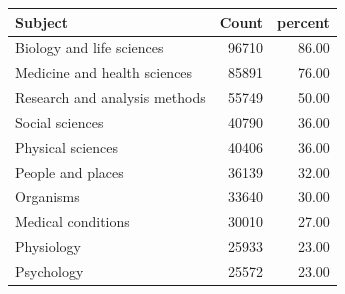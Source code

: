 \begin{table}[ht]
\centering
\begin{tabular}{lrr}
 Subject & Count & percent \\ 
  \hline
Biology and life sciences & 96710 & 86.00 \\ 
  Medicine and health sciences & 85891 & 76.00 \\ 
  Research and analysis methods & 55749 & 50.00 \\ 
  Social sciences & 40790 & 36.00 \\ 
  Physical sciences & 40406 & 36.00 \\ 
  People and places & 36139 & 32.00 \\ 
  Organisms & 33640 & 30.00 \\ 
  Medical conditions & 30010 & 27.00 \\ 
  Physiology & 25933 & 23.00 \\ 
  Psychology & 25572 & 23.00 \\ 
  \end{tabular}
\end{table}
